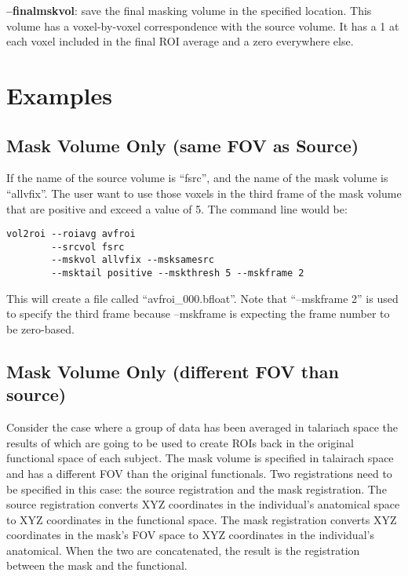 \documentclass[10pt]{article}
\begin{document}
\noindent
{\bf --finalmskvol}: save the final masking volume in the specified
location. This volume has a voxel-by-voxel correspondence with the
source volume.  It has a 1 at each voxel included in the final ROI
average and a zero everywhere else.\\



\section{Examples}

\subsection{Mask Volume Only (same FOV as Source)}

If the name of the source volume is ``fsrc'', and the name  of the
mask volume is ``allvfix''.  The user want to use those voxels in the
third frame of the mask volume that are positive and exceed a value of
5. The command line would be:
\begin{verbatim}
vol2roi --roiavg avfroi
        --srcvol fsrc 
        --mskvol allvfix --msksamesrc 
        --msktail positive --mskthresh 5 --mskframe 2
\end{verbatim}
This will create a file called ``avfroi\_000.bfloat''. Note that
``--mskframe 2'' is used to specify the third frame because --mskframe
is expecting the frame number to be zero-based.\\

\subsection{Mask Volume Only (different FOV than source)}

Consider the case where a group of data has been averaged in talariach
space the results of which are going to be used to create ROIs back in
the original functional space of each subject.  The mask volume is
specified in talairach space and has a different FOV than the original
functionals. Two registrations need to be specified in this case: the
source registration and the mask registration.  The source
registration converts XYZ coordinates in the individual's anatomical
space to XYZ coordinates in the functional space.  The mask
registration converts XYZ coordinates in the mask's FOV space to
XYZ coordinates in the individual's anatomical.  When the two are
concatenated, the result is the registration between the mask and the
functional. 
\end{document}
